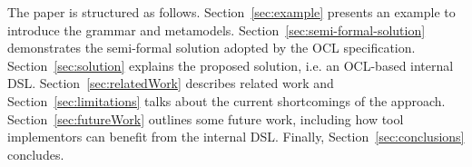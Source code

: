 \documentclass{llncs}
\begin{document}




The paper is structured as follows. Section~\ref{sec:example} presents an example to introduce the grammar and metamodels. Section~\ref{sec:semi-formal-solution} demonstrates the semi-formal solution adopted by the OCL specification. Section~\ref{sec:solution} explains the proposed solution, i.e. an OCL-based internal DSL. Section~\ref{sec:relatedWork} describes related work and Section~\ref{sec:limitations} talks about the current shortcomings of the approach. Section~\ref{sec:futureWork} outlines some future work, including how tool implementors can benefit from the internal DSL. Finally, Section~\ref{sec:conclusions} concludes.
\end{document}
